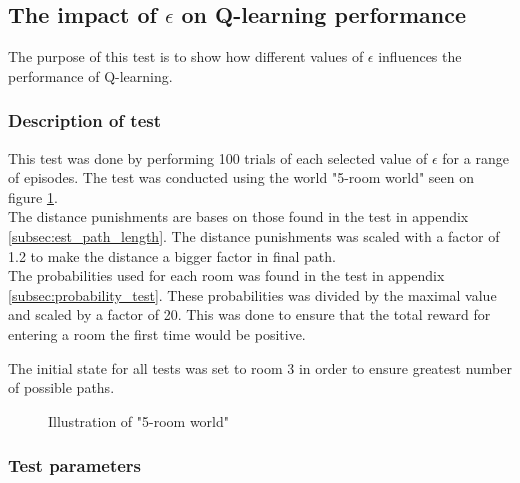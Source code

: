 \documentclass[../Head/Main.tex]{subfiles}
\begin{document}
\subsection{The impact of $\epsilon$ on Q-learning performance}
The purpose of this test is to show how different values of $\epsilon$ influences the performance of Q-learning.
\subsubsection{Description of test}
This test was done by performing 100 trials of each selected value of $\epsilon$ for a range of episodes. The test was conducted using the world "5-room world" seen on figure \ref{fig:5_room_world}.\\
The distance punishments are bases on those found in the test in appendix \ref{subsec:est_path_length}. The distance punishments was scaled with a factor of 1.2 to make the distance a bigger factor in final path.\\
The probabilities used for each room was found in the test in appendix \ref{subsec:probability_test}. These probabilities was divided by the maximal value and scaled by a factor of 20. This was done to ensure that the total reward for entering a room the first time would be positive.\par 
The initial state for all tests was set to room 3 in order to ensure greatest number of possible paths.

\begin{figure}[H]
	\centering
	\caption{Illustration of "5-room world"}
	\label{fig:5_room_world}
\end{figure}

\subsubsection{Test parameters}
\end{document}
